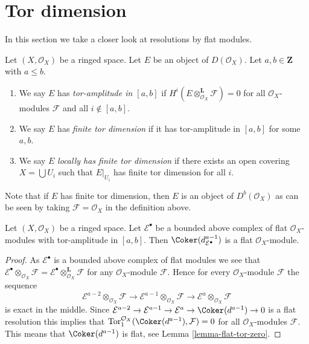 \section{Tor dimension}
\label{section-tor}

\noindent
In this section we take a closer look at resolutions by flat modules.

\begin{definition}
\label{definition-tor-amplitude}
Let $(X, \mathcal{O}_X)$ be a ringed space.
Let $E$ be an object of $D(\mathcal{O}_X)$.
Let $a, b \in \mathbf{Z}$ with $a \leq b$.
\begin{enumerate}
\item We say $E$ has {\it tor-amplitude in $[a, b]$}
if $H^i(E \otimes_{\mathcal{O}_X}^\mathbf{L} \mathcal{F}) = 0$
for all $\mathcal{O}_X$-modules $\mathcal{F}$ and all $i \not \in [a, b]$.
\item We say $E$ has {\it finite tor dimension}
if it has tor-amplitude in $[a, b]$ for some $a, b$.
\item We say $E$ {\it locally has finite tor dimension}
if there exists an open covering $X = \bigcup U_i$ such that
$E|_{U_i}$ has finite tor dimension for all $i$.
\end{enumerate}
\end{definition}

\noindent
Note that if $E$ has finite tor dimension, then $E$ is an object of
$D^b(\mathcal{O}_X)$ as can be seen by taking $\mathcal{F} = \mathcal{O}_X$
in the definition above.

\begin{lemma}
\label{lemma-last-one-flat}
Let $(X, \mathcal{O}_X)$ be a ringed space.
Let $\mathcal{E}^\bullet$ be a bounded above complex of flat
$\mathcal{O}_X$-modules with tor-amplitude in $[a, b]$.
Then $\Coker(d_{\mathcal{E}^\bullet}^{a - 1})$ is a flat
$\mathcal{O}_X$-module.
\end{lemma}

\begin{proof}
As $\mathcal{E}^\bullet$ is a bounded above complex of flat modules we see that
$\mathcal{E}^\bullet \otimes_{\mathcal{O}_X} \mathcal{F} =
\mathcal{E}^\bullet \otimes_{\mathcal{O}_X}^{\mathbf{L}} \mathcal{F}$
for any $\mathcal{O}_X$-module $\mathcal{F}$.
Hence for every $\mathcal{O}_X$-module $\mathcal{F}$ the sequence
$$
\mathcal{E}^{a - 2} \otimes_{\mathcal{O}_X} \mathcal{F} \to
\mathcal{E}^{a - 1} \otimes_{\mathcal{O}_X} \mathcal{F} \to
\mathcal{E}^a \otimes_{\mathcal{O}_X} \mathcal{F}
$$
is exact in the middle. Since
$\mathcal{E}^{a - 2} \to \mathcal{E}^{a - 1} \to \mathcal{E}^a \to
\Coker(d^{a - 1}) \to 0$
is a flat resolution this implies that
$\text{Tor}_1^{\mathcal{O}_X}(\Coker(d^{a - 1}), \mathcal{F}) = 0$
for all $\mathcal{O}_X$-modules $\mathcal{F}$. This means that
$\Coker(d^{a - 1})$ is flat, see Lemma \ref{lemma-flat-tor-zero}.
\end{proof}

